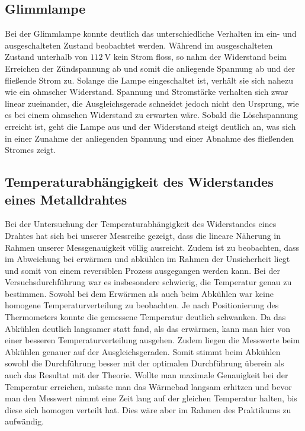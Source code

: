 \subsection{Glimmlampe}
Bei der Glimmlampe konnte deutlich das unterschiedliche Verhalten im ein- und ausgeschalteten Zustand beobachtet werden. Während im ausgeschalteten Zustand unterhalb von $ \SI{112}{\volt} $ kein Strom floss, so nahm der Widerstand beim Erreichen der Zündspannung ab und somit die anliegende Spannung ab und der fließende Strom zu. Solange die Lampe eingeschaltet ist, verhält sie sich nahezu wie ein ohmscher Widerstand. Spannung und Stromstärke verhalten sich zwar linear zueinander, die Ausgleichsgerade schneidet jedoch nicht den Ursprung, wie es bei einem ohmschen Widerstand zu erwarten wäre. Sobald die Löschspannung erreicht ist, geht die Lampe aus und der Widerstand steigt deutlich an, was sich in einer Zunahme der anliegenden Spannung und einer Abnahme des fließenden Stromes zeigt. 


\subsection{Temperaturabhängigkeit des Widerstandes eines Metalldrahtes}
Bei der Untersuchung der Temperaturabhängigkeit des Widerstandes eines Drahtes hat sich bei unserer Messreihe gezeigt, dass die lineare Näherung in Rahmen unserer Messgenauigkeit völlig ausreicht. Zudem ist zu beobachten, dass im Abweichung bei erwärmen und abkühlen im Rahmen der Unsicherheit liegt und somit von einem reversiblen Prozess ausgegangen werden kann. Bei der Versuchsdurchführung war es insbesondere schwierig, die Temperatur genau zu bestimmen. Sowohl bei dem Erwärmen als auch beim Abkühlen war keine homogene Temperaturverteilung zu beobachten. Je nach Positionierung des Thermometers konnte die gemessene Temperatur deutlich schwanken. Da das Abkühlen deutlich langsamer statt fand, als das erwärmen, kann man hier von einer besseren Temperaturverteilung ausgehen. Zudem liegen die Messwerte beim Abkühlen genauer auf der Ausgleichsgeraden. Somit stimmt beim Abkühlen sowohl die Durchführung besser mit der optimalen Durchführung überein als auch das Resultat mit der Theorie. Wollte man maximale Genauigkeit bei der Temperatur erreichen, müsste man das Wärmebad langsam erhitzen und bevor man den Messwert nimmt eine Zeit lang auf der gleichen Temperatur halten, bis diese sich homogen verteilt hat. Dies wäre aber im Rahmen des Praktikums zu aufwändig. 
